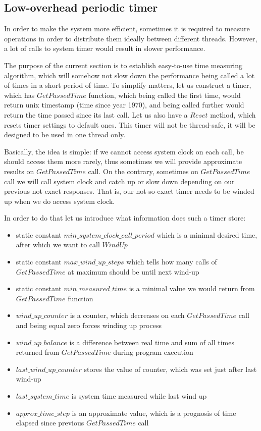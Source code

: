 \documentclass{article}
\begin{document}
\subsection{Low-overhead periodic timer}
\label{subsec:low_overhead_periodic_timer}

In order to make the system more efficient, sometimes it is required to measure operations in order to distribute them ideally between different threads. However, a lot of calls to system timer would result in slower performance.

The purpose of the current section is to establish easy-to-use time measuring algorithm, which will somehow not slow down the performance being called a lot of times in a short period of time. To simplify matters, let us construct a timer, which has $GetPassedTime$ function, which being called the first time, would return unix timestamp (time since year 1970), and being called further would return the time passed since its last call. Let us also have a $Reset$ method, which resets timer settings to default ones. This timer will not be thread-safe, it will be designed to be used in one thread only.

Basically, the idea is simple: if we cannot access system clock on each call, be should access them more rarely, thus sometimes we will provide approximate results on $GetPassedTime$ call. On the contrary, sometimes on $GetPassedTime$ call we will call system clock and catch up or slow down depending on our previous not exact responses. That is, our not-so-exact timer needs to be winded up when we do access system clock.

In order to do that let us introduce what information does such a timer store:
\begin{itemize}
	\item static constant $min\_system\_clock\_call\_period$ which is a minimal desired time, after which we want to call $WindUp$
	\item static constant $max\_wind\_up\_steps$ which tells how many calls of $GetPassedTime$ at maximum should be until next wind-up
	\item static constant $min\_measured\_time$ is a minimal value we would return from $GetPassedTime$ function
	\item $wind\_up\_counter$ is a counter, which decreases on each $GetPassedTime$ call and being equal zero forces winding up process
	\item $wind\_up\_balance$ is a difference between real time and sum of all times returned from $GetPassedTime$ during program execution
	\item $last\_wind\_up\_counter$ stores the value of counter, which was set just after last wind-up
	\item $last\_system\_time$ is system time measured while last wind up
	\item $approx\_time\_step$ is an approximate value, which is a prognosis of time elapsed since previous $GetPassedTime$ call
\end{itemize}
\end{document}
